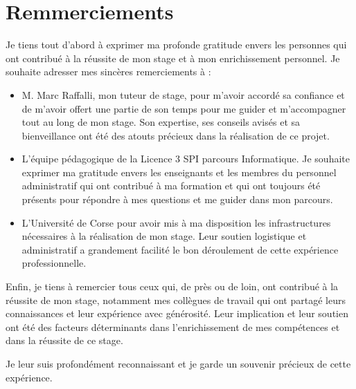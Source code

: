 \chapter*{Remmerciements}

Je tiens tout d'abord à exprimer ma profonde gratitude envers les personnes qui ont contribué à la réussite de mon stage et à mon enrichissement personnel. Je souhaite adresser mes sincères remerciements à :

\begin{itemize}

\item M. Marc Raffalli, mon tuteur de stage, pour m'avoir accordé sa confiance et de m'avoir offert une partie de son temps pour me guider et m'accompagner tout au long de mon stage. Son expertise, ses conseils avisés et sa bienveillance ont été des atouts précieux dans la réalisation de ce projet.

\item L'équipe pédagogique de la Licence 3 SPI parcours Informatique. Je souhaite exprimer ma gratitude envers les enseignants et les membres du personnel administratif qui ont contribué à ma formation et qui ont toujours été présents pour répondre à mes questions et me guider dans mon parcours.

\item L'Université de Corse pour avoir mis à ma disposition les infrastructures nécessaires à la réalisation de mon stage. Leur soutien logistique et administratif a grandement facilité le bon déroulement de cette expérience professionnelle.
\end{itemize}

Enfin, je tiens à remercier tous ceux qui, de près ou de loin, ont contribué à la réussite de mon stage, notamment mes collègues de travail qui ont partagé leurs connaissances et leur expérience avec générosité. Leur implication et leur soutien ont été des facteurs déterminants dans l'enrichissement de mes compétences et dans la réussite de ce stage.

Je leur suis profondément reconnaissant et je garde un souvenir précieux de cette expérience.